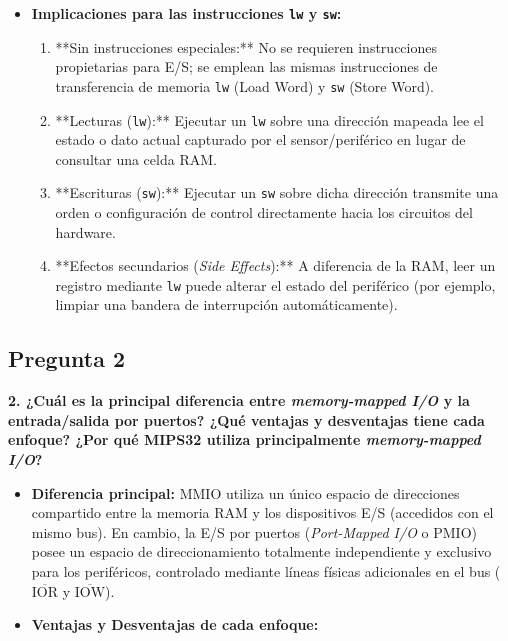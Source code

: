 \documentclass[12pt, letterpaper]{article}
\begin{document}
\begin{itemize}
    \item \textbf{Implicaciones para las instrucciones \texttt{lw} y \texttt{sw}:}
    \begin{enumerate}
        \item **Sin instrucciones especiales:** No se requieren instrucciones propietarias para E/S; se emplean las mismas instrucciones de transferencia de memoria \texttt{lw} (Load Word) y \texttt{sw} (Store Word).
        \item **Lecturas (\texttt{lw}):** Ejecutar un \texttt{lw} sobre una dirección mapeada lee el estado o dato actual capturado por el sensor/periférico en lugar de consultar una celda RAM.
        \item **Escrituras (\texttt{sw}):** Ejecutar un \texttt{sw} sobre dicha dirección transmite una orden o configuración de control directamente hacia los circuitos del hardware.
        \item **Efectos secundarios (\textit{Side Effects}):** A diferencia de la RAM, leer un registro mediante \texttt{lw} puede alterar el estado del periférico (por ejemplo, limpiar una bandera de interrupción automáticamente).
    \end{enumerate}
\end{itemize}

\hr

\subsection*{Pregunta 2}
\textbf{2. ¿Cuál es la principal diferencia entre \textit{memory-mapped I/O} y la entrada/salida por puertos? ¿Qué ventajas y desventajas tiene cada enfoque? ¿Por qué MIPS32 utiliza principalmente \textit{memory-mapped I/O}?}

\begin{itemize}
    \item \textbf{Diferencia principal:} MMIO utiliza un único espacio de direcciones compartido entre la memoria RAM y los dispositivos E/S (accedidos con el mismo bus). En cambio, la E/S por puertos (\textit{Port-Mapped I/O} o PMIO) posee un espacio de direccionamiento totalmente independiente y exclusivo para los periféricos, controlado mediante líneas físicas adicionales en el bus ($\overline{\text{IOR}}$ y $\overline{\text{IOW}}$).
    
    \item \textbf{Ventajas y Desventajas de cada enfoque:}
\end{itemize}
\end{document}
